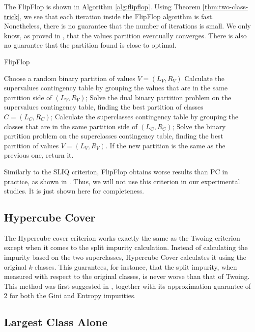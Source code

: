 The FlipFlop is shown in Algorithm \ref{alg:flipflop}. Using Theorem \ref{thm:two-class-trick}, we see that each iteration inside the FlipFlop algorithm is fast. Nonetheless, there is no guarantee that the number of iterations is small. We only know, as proved in \cite{nadas1991iterative}, that the values partition eventually converges. There is also no guarantee that the partition found is close to optimal.

\begin{algorithm}[tb]
\caption{FlipFlop}
\label{alg:flipflop}
\begin{algorithmic}
\STATE Choose a random binary partition of values $V = (L_V, R_V)$
\STATE Calculate the supervalues contingency table by grouping the values that are in the same partition side of $(L_V, R_V)$;
\STATE
\STATE Solve the dual binary partition problem on the supervalues contingency table, finding the best partition of classes $C = (L_C, R_C)$;
\STATE
\STATE Calculate the superclasses contingency table by grouping the classes that are in the same partition side of $(L_C, R_C)$;
\STATE
\STATE Solve the binary partition problem on the superclasses contingency table, finding the best partition of values $V = (L_V, R_V)$. If the new partition is the same as the previous one, return it.
\ENDWHILE
\end{algorithmic}
\end{algorithm}


Similarly to the SLIQ criterion, FlipFlop obtains worse results than PC in practice, as shown in \cite{journals/datamine/CoppersmithHH99}. Thus, we will not use this criterion in our experimental studies. It is just shown here for completeness.


\subsection{Hypercube Cover}

The Hypercube cover criterion works exactly the same as the Twoing criterion except when it comes to the split impurity calculation. Instead of calculating the impurity based on the two superclasses, Hypercube Cover calculates it using the original $k$ classes. This guarantees, for instance, that the split impurity, when measured with respect to the original classes, is never worse than that of Twoing. This method was first suggested in \cite{icml2018}, together with its approximation guarantee of 2 for both the Gini and Entropy impurities.


\subsection{Largest Class Alone}


